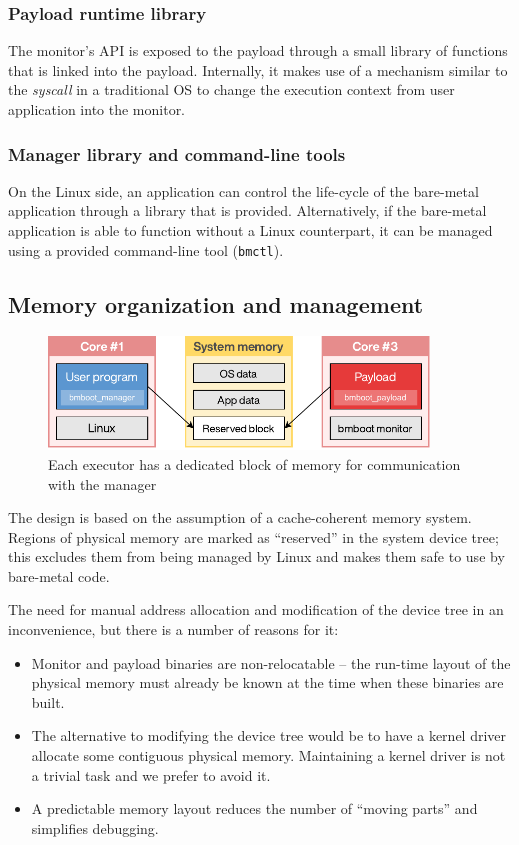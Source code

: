 \subsubsection{Payload runtime library}

The monitor's API is exposed to the payload through a small library of functions that is linked into the payload. Internally, it makes use of a mechanism similar to the \textit{syscall} in a traditional OS to change the execution context from user application into the monitor.

\subsubsection{Manager library and command-line tools}

On the Linux side, an application can control the life-cycle of the bare-metal application through a library that is provided. Alternatively, if the bare-metal application is able to function without a Linux counterpart, it can be managed using a provided command-line tool (\texttt{bmctl}).

\subsection{Memory organization and management}

\begin{figure}[h]
  \centering
  \includegraphics[width=0.9\textwidth]{images/memory-arch.pdf}
  \caption{Each executor has a dedicated block of memory for communication with the manager}
\end{figure}

The design is based on the assumption of a cache-coherent memory system. Regions of physical memory are marked as ``reserved'' in the system device tree; this excludes them from being managed by Linux and makes them safe to use by bare-metal code.

The need for manual address allocation and modification of the device tree in an inconvenience, but there is a number of reasons for it:

\begin{itemize}
    \item Monitor and payload binaries are non-relocatable -- the run-time layout of the physical memory must already be known at the time when these binaries are built.
    \item The alternative to modifying the device tree would be to have a kernel driver allocate some contiguous physical memory. Maintaining a kernel driver is not a trivial task and we prefer to avoid it.
    \item A predictable memory layout reduces the number of ``moving parts'' and simplifies debugging.
\end{itemize}

